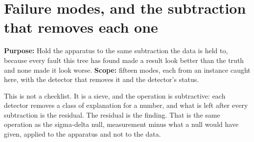 %
%
%
%
%
\chapter{Failure modes, and the subtraction that removes each one}

\textbf{Purpose:} Hold the apparatus to the same subtraction the data is held to, because every fault this tree has found made a result look better than the truth and none made it look worse. \textbf{Scope:} fifteen modes, each from an instance caught here, with the detector that removes it and the detector's status.

This is not a checklist. It is a sieve, and the operation is subtractive: each detector removes a class of explanation for a number, and what is left after every subtraction is the residual. The residual is the finding. That is the same operation as the sigma-delta null, measurement minus what a null would have given, applied to the apparatus and not to the data.


